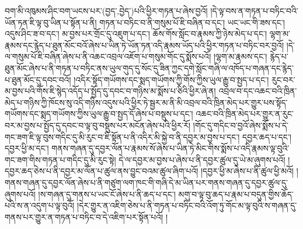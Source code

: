 བག་མི་འཁུམས་ཤིང་བག་ཡངས་པར་(བྱད་‚བྱེད་)པའི་ཕྱིར་གཏན་པ་ཞེས་བྱའོ། །དེ་ལྟ་བས་ན་གཏན་པ་བཏིང་བའི་ཡོན་ཏན་ཇི་ལྟ་བུ་ཡིན་པ་སྟོན་པ་ནི། གཏན་པ་བཏིང་བ་ནི་གསུམ་པོ་ཇི་བཞིན་བ་དང་། ཡང་ཡང་གི་ཟས་དང་། འདུས་ཤིང་ཟ་བ་དང་། མ་བྱས་པར་གྲོང་དུ་འཇུག་པ་དང་། ཆོས་གོས་སློང་བ་རྣམས་ཀྱི་ཉེས་མེད་པ་དང་། ལྷག་མ་རྣམས་དང་རྙེད་པ་ཐུན་མོང་བའོ་ཞེས་པ་ཡིན་ཏེ་ཡོན་ཏན་འདི་རྣམས་ཡོད་པའི་ཕྱིར་གཏན་པ་བཏིང་བར་བྱའོ། །དེ་ལ་གསུམ་པོ་ཇི་བཞིན་ཞེས་པ་ནི་འཆང་འབྲལ་འཇོག་པ་གསུམ་གོང་དུ་སྨོས་པའོ། །ལྷག་མ་རྣམས་དང་། རྙེད་པ་ཐུན་མོང་ཞེས་པ་ནི་གཏན་པ་བཏིང་ནས་ཡུལ་གུད་དུ་སོང་དུ་ཟིན་ཀྱང་དགེ་སློང་གཞི་ལ་འཁོད་པ་གཞན་དང་རྙེད་པ་ཐུན་མོང་དུ་དབང་བའོ། །འདིར་སྟོད་གཡོགས་དང་སྨད་གཡོགས་ཀྱི་གོས་ཀྱིས་ཡུལ་རྒྱུ་བ་སྤྱད་པ་དང་། རུང་བར་མ་བྱས་པའི་གོས་ཇི་སྙེད་འདོད་པ་སྤྱོད་དུ་དབང་བ་གཉིས་མ་སྨོས་པ་ཅིའི་ཕྱིར་ཞེ་ན། འབྲལ་བ་དང་འཆང་བའི་ཁྲིན་མེད་པ་གཉིས་ཀྱི་ཁོངས་སུ་འདི་གཉིས་འདུས་པའི་ཕྱིར་ཏེ་སྦྱར་མ་ནི་མི་འབྲལ་བའི་ཁྲིན་མེད་པར་གྱུར་པས་སྟོད་གཡོགས་དང་སྨད་གཡོགས་ཀྱིས་ཡུལ་རྒྱུ་བ་སྤྱད་དོ་ཞེས་པ་བསྡུས་པ་དང་། འཆང་བའི་ཁྲིན་མེད་པར་གྱུར་ན་རུང་བར་མ་བྱས་པ་སྤྱོད་དུ་དབང་བ་ལྟ་བུ་བསྡུས་པར་མངོན་ཞེས་པའི་ཕྱིར་རོ། །གོང་དུ་གདིང་བ་བྱའོ་ཞེས་སྨོས་པ་དེ་གང་ཟག་ཇི་ལྟ་བུས་གདིང་དུ་མི་རུང་བ་ཇི་སྟོན་པ་ནི་འདིར་མི་སྐྱེ་བ་ནི་དབྱར་མ་བྱས་པ་དང་། དབྱར་ཆད་པ་དང་། དབྱར་ཕྱི་མ་དང་། གནས་གཞན་དུ་དབྱར་ལོན་པ་རྣམས་སོ་ཞེས་པ་ཡིན་ཏེ་མིང་གིས་སྨོས་པ་འདི་རྣམས་ལྟ་བུའི་གང་ཟག་གིས་གཏན་པ་གདིང་དུ་མི་རུང་སྟེ། དེ་ལ་དབྱར་མ་བྱས་པ་ཞེས་པ་ནི་དབྱར་ཚུལ་དུ་ཡེ་མ་ཞུགས་པའོ། །དབྱར་ཆད་ཅེས་པ་ནི་དབྱར་མ་ལོན་པ་ཚུལ་ནས་བྱུང་བའམ་ཚུལ་ཞིག་པའོ། །དབྱར་ཕྱི་མ་ཞེས་པ་ནི་ཚུལ་ཕྱི་མའོ། །གནས་གཞན་དུ་དབྱར་ལོན་ཞེས་པ་ནི་གཙུག་ལག་ཁང་གི་གཞི་དེ་མ་ཡིན་པར་གནས་གཞན་དུ་དབྱར་ཚུལ་དུ་ཞུགས་པའོ། །ས་གཞན་དུ་གནས་པ་ཡང་ངོ་ཞེས་པ་ནི་ཆད་པ་དང་། མགུ་བ་ལྟ་བུ་ཆད་པ་རྣམ་པ་བདུན་གྱིས་ཆོད་པའི་ས་ན་འདུག་པ་ལྟ་བུའོ། །དེར་གྱུར་ན་འཇིག་ཅེས་པ་ནི་གཏན་པ་བཏིང་བའི་འོག་ཏུ་གོང་མ་ལྟ་བུའི་ས་གཞན་དུ་གནས་པར་གྱུར་ན་གཏན་པ་བཏིང་བ་དེ་འཇིག་པར་སྟོན་པའོ། །
